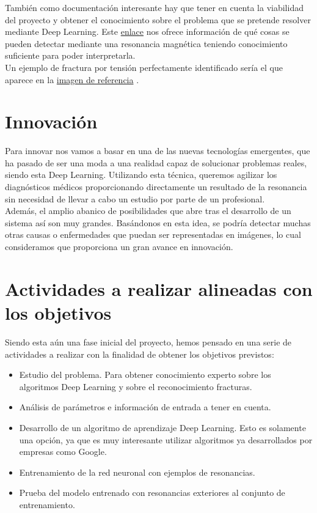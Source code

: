 También como documentación interesante hay que tener en cuenta la viabilidad del proyecto y obtener el conocimiento sobre el problema que se pretende resolver mediante Deep Learning. Este \href{https://blog.hospitalsanangelinn.mx/resonancia-magnetica-diagnostico}{enlace} \cite{article:resonancia} nos ofrece información de qué cosas se pueden detectar mediante una resonancia magnética teniendo conocimiento suficiente para poder interpretarla. \\

Un ejemplo de fractura por tensión perfectamente identificado sería el que aparece en la \href{https://www.google.es/search?q=resonancia+magnetica+con+fractura&source=lnms&tbm=isch&sa=X&ved=0ahUKEwj_ydaisK7eAhVDgRoKHeGoDsUQ_AUIDigB&biw=1536&bih=754#imgrc=5wcLStUv22LjAM:}{imagen de referencia} \cite{misc:imagen}.

\section{Innovación}

Para innovar nos vamos a basar en una de las nuevas tecnologías emergentes, que ha pasado de ser una moda a una realidad capaz de solucionar problemas reales, siendo esta Deep Learning. Utilizando esta técnica, queremos agilizar los diagnósticos médicos proporcionando directamente un resultado de la resonancia sin necesidad de llevar a cabo un estudio por parte de un profesional. \\

Además, el amplio abanico de posibilidades que abre tras el desarrollo de un sistema así son muy grandes. Basándonos en esta idea, se podría detectar muchas otras causas o enfermedades que puedan ser representadas en imágenes, lo cual consideramos que proporciona un gran avance en innovación.

\section{Actividades a realizar alineadas con los objetivos}

Siendo esta aún una fase inicial del proyecto, hemos pensado en una serie de actividades a realizar con la finalidad de obtener los objetivos previstos:

\begin{itemize}
	\item Estudio del problema. Para obtener conocimiento experto sobre los algoritmos Deep Learning y sobre el reconocimiento fracturas.
	\item Análisis de parámetros e información de entrada a tener en cuenta.
	\item Desarrollo de un algoritmo de aprendizaje Deep Learning. Esto es solamente una opción, ya que es muy interesante utilizar algoritmos ya desarrollados por empresas como Google.
	\item Entrenamiento de la red neuronal con ejemplos de resonancias.
	\item Prueba del modelo entrenado con resonancias exteriores al conjunto de entrenamiento.
\end{itemize}

